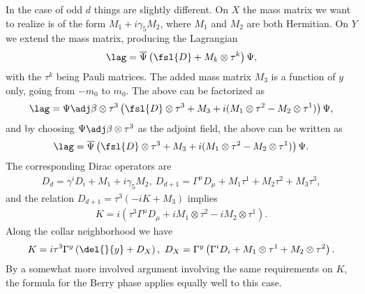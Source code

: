 In the case of odd $d$ things are slightly different. On $X$ the mass matrix we want to realize is of the form $M_{1} + i\gamma_{5}M_{2}$, where $M_{1}$ and $M_{2}$ are both Hermitian. On $Y$ we extend the mass matrix, producing the Lagrangian
\begin{align*}
	\lag = \overline{\Psi}\left(\fsl{D} + M_{k}\otimes\tau^{k}\right)\Psi,
\end{align*}
with the $\tau^{k}$ being Pauli matrices. The added mass matrix $M_{3}$ is a function of $y$ only, going from $-m_{0}$ to $m_{0}$. The above can be factorized as
\begin{align*}
	\lag = \Psi\adj\beta\otimes\tau^{3}\left(\fsl{D}\otimes\tau^{3} + M_{3} + i(M_{1}\otimes\tau^{2} - M_{2}\otimes\tau^{1})\right)\Psi,
\end{align*}
and by choosing $\Psi\adj\beta\otimes\tau^{3}$ as the adjoint field, the above can be written as
\begin{align*}
	\lag = \overline{\Psi}\left(\fsl{D}\otimes\tau^{3} + M_{3} + i(M_{1}\otimes\tau^{2} - M_{2}\otimes\tau^{1})\right)\Psi.
\end{align*}
The corresponding Dirac operators are
\begin{align*}
	D_{d} = \gamma^{i}D_{i} + M_{1} + i\gamma_{5}M_{2},\ D_{d + 1} = \Gamma^{\mu}D_{\mu} + M_{1}\tau^{1} + M_{2}\tau^{2} + M_{3}\tau^{3},
\end{align*}
and the relation $D_{d + 1} = \tau^{3}(-iK + M_{3})$ implies
\begin{align*}
	K = i\left(\tau^{3}\Gamma^{\mu}D_{\mu} + iM_{1}\otimes\tau^{2} - iM_{2}\otimes\tau^{1}\right).
\end{align*}
Along the collar neighborhood we have
\begin{align*}
	K = i\tau^{3}\Gamma^{y}\left(\del{}{y} + D_{X}\right),\ D_{X} = \Gamma^{y}\left(\Gamma^{i}D_{i} + M_{1}\otimes\tau^{1} + M_{2}\otimes\tau^{2}\right).
\end{align*}
By a somewhat more involved argument involving the same requirements on $K$, the formula for the Berry phase applies equally well to this case.

